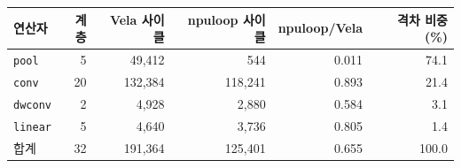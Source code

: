 \setlength{\tabcolsep}{5pt}
\begin{tabular}{lrrrrr}
\toprule
연산자 & 계층 & Vela 사이클 & npuloop 사이클 & npuloop/Vela & 격차 비중(\%) \\
\midrule
\texttt{pool} & 5 & 49,412 & 544 & 0.011 & 74.1 \\
\texttt{conv} & 20 & 132,384 & 118,241 & 0.893 & 21.4 \\
\texttt{dwconv} & 2 & 4,928 & 2,880 & 0.584 & 3.1 \\
\texttt{linear} & 5 & 4,640 & 3,736 & 0.805 & 1.4 \\
\midrule
합계 & 32 & 191,364 & 125,401 & 0.655 & 100.0 \\
\bottomrule
\end{tabular}
